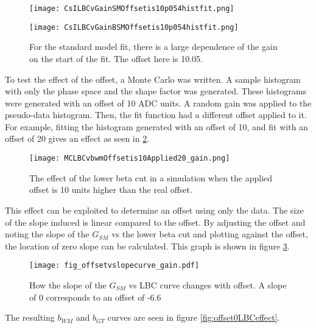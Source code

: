 \documentclass[../MaxHughesThesis.tex]{subfiles}
\begin{document}
\begin{figure}
    \centering
    \begin{minipage}{0.50\textwidth}
        \centerline{\texttt{[image: CsILBCvGainSMOffsetis10p054histfit.png]}}
    \end{minipage}\hfill
    \begin{minipage}{0.50\textwidth}
        \centerline{\texttt{[image: CsILBCvGainBSMOffsetis10p054histfit.png]}}
    \end{minipage}
    \caption{For the standard model fit, there is a large dependence of the gain on the start of the fit.
	     The offset here is 10.05.}
    \label{fig:offset10LBCeffect}
\end{figure}

To test the effect of the offset, a Monte Carlo was written.
A sample histogram with only the phase space and the shape factor was generated. 
These histograms were generated with an offset of 10 ADC units.
A random gain was applied to the pseudo-data histogram. 
Then, the fit function had a different offset applied to it.
For example, fitting the histogram generated with an offset of 10, and fit with an offset of 20 gives an effect as seen in \ref{fig:MCoffset10applied20}.

\begin{figure}
	\centerline{\texttt{[image: MCLBCvbwmOffsetis10Applied20\_gain.png]}}
	\caption{The effect of the lower beta cut in a simulation when the applied offset is 10 units higher than the real offset.}
	\label{fig:MCoffset10applied20}
\end{figure}

This effect can be exploited to determine an offset using only the data. 
The size of the slope induced is linear compared to the offset. %
By adjusting the offset and noting the slope of the $G_{SM}$ vs the lower beta cut and plotting against the offset, the location of zero slope can be calculated.
This graph is shown in figure \ref{fig:slopevoffset}.
\begin{figure}[!htb]
	\centerline{\texttt{[image: fig\_offsetvslopecurve\_gain.pdf]}}
	\caption{How the slope of the $G_{SM}$ vs LBC curve changes with offset.
		 A slope of 0 corresponds to an offset of -6.6}
	\label{fig:slopevoffset}
\end{figure}
The resulting $b_{WM}$ and $b_{GT}$ curves are seen in figure \ref{fig:offset0LBCeffect}.
\end{document}
